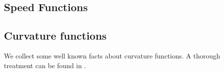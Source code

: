 


\subsection{Speed Functions}
\label{subsec:bg_speed}

\subsection*{Curvature functions}
We collect some well known facts about curvature functions. A thorough treatment can be found in \cite[Ch.~2]{Gerhardt:/2006}.

